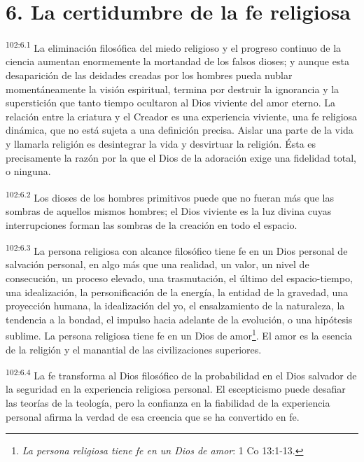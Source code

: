 \section*{6. La certidumbre de la fe religiosa}
\par
\textsuperscript{102:6.1} La eliminación filosófica del miedo religioso y el progreso continuo de la ciencia aumentan enormemente la mortandad de los falsos dioses; y aunque esta desaparición de las deidades creadas por los hombres pueda nublar momentáneamente la visión espiritual, termina por destruir la ignorancia y la superstición que tanto tiempo ocultaron al Dios viviente del amor eterno. La relación entre la criatura y el Creador es una experiencia viviente, una fe religiosa dinámica, que no está sujeta a una definición precisa. Aislar una parte de la vida y llamarla religión es desintegrar la vida y desvirtuar la religión. Ésta es precisamente la razón por la que el Dios de la adoración exige una fidelidad total, o ninguna.

\par
\textsuperscript{102:6.2} Los dioses de los hombres primitivos puede que no fueran más que las sombras de aquellos mismos hombres; el Dios viviente es la luz divina cuyas interrupciones forman las sombras de la creación en todo el espacio.

\par
\textsuperscript{102:6.3} La persona religiosa con alcance filosófico tiene fe en un Dios personal de salvación personal, en algo más que una realidad, un valor, un nivel de consecución, un proceso elevado, una trasmutación, el último del espacio-tiempo, una idealización, la personificación de la energía, la entidad de la gravedad, una proyección humana, la idealización del yo, el ensalzamiento de la naturaleza, la tendencia a la bondad, el impulso hacia adelante de la evolución, o una hipótesis sublime. La persona religiosa tiene fe en un Dios de amor\footnote{\textit{La persona religiosa tiene fe en un Dios de amor}: 1 Co 13:1-13.}. El amor es la esencia de la religión y el manantial de las civilizaciones superiores.

\par
\textsuperscript{102:6.4} La fe transforma al Dios filosófico de la probabilidad en el Dios salvador de la seguridad en la experiencia religiosa personal. El escepticismo puede desafiar las teorías de la teología, pero la confianza en la fiabilidad de la experiencia personal afirma la verdad de esa creencia que se ha convertido en fe.

